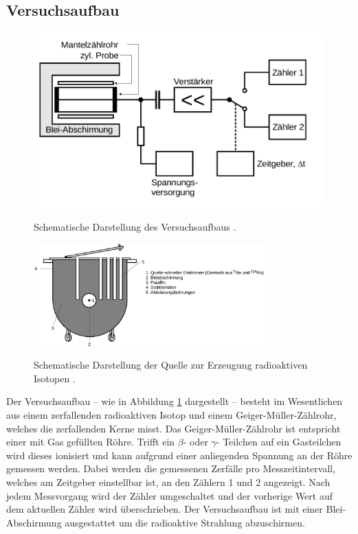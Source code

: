 \subsection{Versuchsaufbau}
\label{sec:Versuchsaufbau}
\begin{figure}
	\centering
	\caption[width=0.8\textwidth]{Schematische Darstellung des Versuchsaufbaus \cite{Anleitung}.}
	\includegraphics{Bilder/aufbau.png}
	\label{fig:aufbau}
\end{figure}

\begin{figure}
	\centering
	\caption{Schematische Darstellung der Quelle zur Erzeugung radioaktiven Isotopen \cite{Anleitung}.}
	\includegraphics[width=0.8\textwidth]{Bilder/toepfchen.png}%
	\label{fig:kochen}
\end{figure}

Der Versuchsaufbau -- wie in Abbildung \ref{fig:aufbau} dargestellt -- besteht im Wesentlichen
aus einem zerfallenden radioaktiven Isotop und einem Geiger-Müller-Zählrohr, welches die
zerfallenden Kerne misst.
Das Geiger-Müller-Zählrohr ist entspricht einer mit Gas gefüllten Röhre. Trifft ein $\beta$-
oder $\gamma$- Teilchen auf ein Gasteilchen wird dieses ionisiert und kann aufgrund einer
anliegenden Spannung an der Röhre gemessen werden.
Dabei werden die gemessenen Zerfälle pro Messzeitintervall, welches am Zeitgeber einstellbar
ist, an den Zählern 1 und 2 angezeigt. Nach jedem Messvorgang wird der Zähler umgeschaltet und
der vorherige Wert auf dem aktuellen Zähler wird überschrieben. Der Versuchsaufbau ist mit
einer Blei-Abschirmung ausgestattet um die radioaktive Strahlung abzuschirmen.

